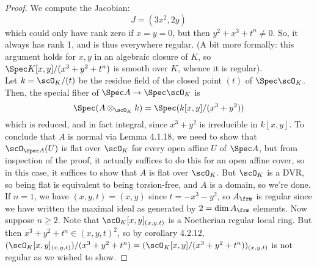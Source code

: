 \begin{proof}
	We compute the Jacobian:
	\[ J = (3x^2,2y) \]
	which could only have rank zero if $x=y=0$, but then $y^2+x^3+t^n \neq 0$. So, it always has rank 1, and is thus everywhere regular. (A bit more formally: this argument holds for $x,y$ in an algebraic closure of $K$, so $\Spec K[x,y]/(x^3+y^2+t^n)$ is smooth over $K$, whence it is regular).  \\
	
	Let $k = \scO_K/(t)$ be the residue field of the closed point $(t)$ of $\Spec \scO_K$. Then, the special fiber of $\Spec A \to \Spec \scO_K$ is
	\[ \Spec(A \otimes_{\scO_K} k) = \Spec(k[x,y]/(x^3+y^2)) \]
	which is reduced, and in fact integral, since $x^3+y^2$ is irreducible in $k[x,y]$. To conclude that $A$ is normal via Lemma 4.1.18, we need to show that $\scO_{\Spec A}(U)$ is flat over $\scO_K$ for every open affine $U$ of $\Spec A$, but from inspection of the proof, it actually suffices to do this for an open affine cover, so in this case, it suffices to show that $A$ is flat over $\scO_K$. But $\scO_K$ is a DVR, so being flat is equivalent to being torsion-free, and $A$ is a domain, so we're done. \\
	
	If $n=1$, we have $(x,y,t) = (x,y)$ since $t = -x^3-y^2$, so $A_\frm$ is regular since we have written the maximal ideal as generated by $2 = \dim A_\frm$ elements. Now suppose $n \geq 2$. Note that $\scO_K[x,y]_{(x,y,t)}$ is a Noetherian regular local ring. But then $x^3+y^2+t^n \in (x,y,t)^2$, so by corollary 4.2.12, $(\scO_K[x,y]_{(x,y,t)})/(x^3+y^2+t^n) = (\scO_K[x,y]/(x^3+y^2+t^n))_{(x,y,t)}$ is not regular as we wished to show.
\end{proof}
